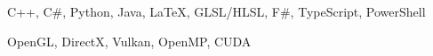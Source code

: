 \begin{cvskills}
	{C++, C\#, Python, Java, \LaTeX{}, GLSL/HLSL, F\#, TypeScript, PowerShell} %


	{OpenGL, DirectX, Vulkan, OpenMP, CUDA} %

\end{cvskills}
